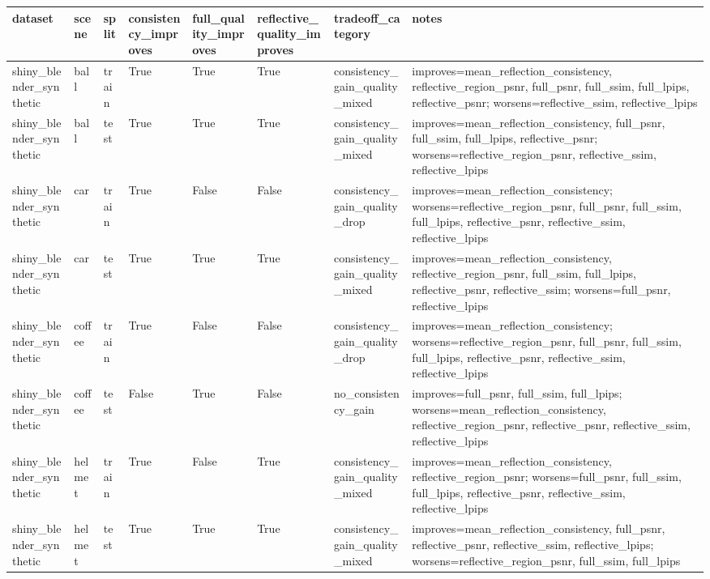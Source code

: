 \begin{tabular}{llllllll}
\toprule
dataset & scene & split & consistency\_improves & full\_quality\_improves & reflective\_quality\_improves & tradeoff\_category & notes \\
\midrule
shiny\_blender\_synthetic & ball & train & True & True & True & consistency\_gain\_quality\_mixed & improves=mean\_reflection\_consistency, reflective\_region\_psnr, full\_psnr, full\_ssim, full\_lpips, reflective\_psnr; worsens=reflective\_ssim, reflective\_lpips \\
shiny\_blender\_synthetic & ball & test & True & True & True & consistency\_gain\_quality\_mixed & improves=mean\_reflection\_consistency, full\_psnr, full\_ssim, full\_lpips, reflective\_psnr; worsens=reflective\_region\_psnr, reflective\_ssim, reflective\_lpips \\
shiny\_blender\_synthetic & car & train & True & False & False & consistency\_gain\_quality\_drop & improves=mean\_reflection\_consistency; worsens=reflective\_region\_psnr, full\_psnr, full\_ssim, full\_lpips, reflective\_psnr, reflective\_ssim, reflective\_lpips \\
shiny\_blender\_synthetic & car & test & True & True & True & consistency\_gain\_quality\_mixed & improves=mean\_reflection\_consistency, reflective\_region\_psnr, full\_ssim, full\_lpips, reflective\_psnr, reflective\_ssim; worsens=full\_psnr, reflective\_lpips \\
shiny\_blender\_synthetic & coffee & train & True & False & False & consistency\_gain\_quality\_drop & improves=mean\_reflection\_consistency; worsens=reflective\_region\_psnr, full\_psnr, full\_ssim, full\_lpips, reflective\_psnr, reflective\_ssim, reflective\_lpips \\
shiny\_blender\_synthetic & coffee & test & False & True & False & no\_consistency\_gain & improves=full\_psnr, full\_ssim, full\_lpips; worsens=mean\_reflection\_consistency, reflective\_region\_psnr, reflective\_psnr, reflective\_ssim, reflective\_lpips \\
shiny\_blender\_synthetic & helmet & train & True & False & True & consistency\_gain\_quality\_mixed & improves=mean\_reflection\_consistency, reflective\_region\_psnr; worsens=full\_psnr, full\_ssim, full\_lpips, reflective\_psnr, reflective\_ssim, reflective\_lpips \\
shiny\_blender\_synthetic & helmet & test & True & True & True & consistency\_gain\_quality\_mixed & improves=mean\_reflection\_consistency, full\_psnr, reflective\_psnr, reflective\_ssim, reflective\_lpips; worsens=reflective\_region\_psnr, full\_ssim, full\_lpips \\

\end{tabular}
